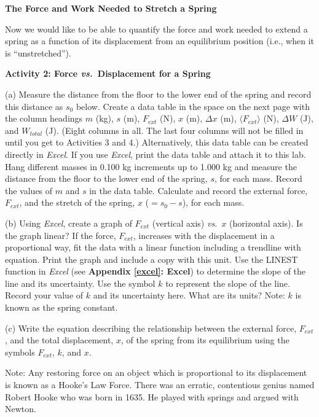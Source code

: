 \textbf{The Force and Work Needed to Stretch a Spring} 

Now we would like to be able to quantify the force and work needed to extend
a spring as a function of its displacement from an equilibrium position (i.e.,
when it is ``unstretched'').

\textbf{Activity 2: Force \textit{vs.}~Displacement for a Spring }

(a) Measure the distance from the floor to the lower end of the spring and record this distance as \( s_{0} \) below. Create a data table in the space on the
next page with the column headings $m$ (kg), $s$ (m), \( F_{ext} \) (N), 
$x$ (m), \( \Delta  x\)
(m), \(\langle F_{ext}\rangle \) (N), \( \Delta  W\) (J), and \( W_{total} \) (J). (Eight columns in all. 
The last four columns will not be filled in until you get to Activities 3 and 4.) 
Alternatively, this data table can be created directly in \textit{Excel}. 
If you use \textit{Excel}, print the data table and attach it to this lab.
Hang different masses in 0.100 kg increments up to 1.000 kg and measure the distance from the floor to the lower end of the spring, $s$, for each mass. 
Record the values of $m$ and $s$ in the data table. 
Calculate and record the external force, \( F_{ext} \), and the stretch of the spring, \(x\) (\(= s_{0} - s\)), for each mass.
\newpage
{\ \ \ }
 \answerspace{60mm}

(b) Using \textit{Excel}, create a graph of \( F_{ext} \) (vertical axis) \textit{vs.}~$x$ (horizontal axis). Is the graph linear?
If the force, \( F_{ext} \), increases with the displacement in a proportional
way, fit the data with a linear function including a trendline with equation. 
Print the graph and include a copy with this unit. Use the LINEST function 
in \textit{Excel} (see \textbf{Appendix \ref{excel}: Excel}) to determine the slope of the 
line and its uncertainty. Use the symbol $k$ to represent the slope of the line.
Record your value of $k$ and its uncertainty here. What are its units? 
Note:  $k$ is known as the spring constant.
\answerspace{15mm}

(c) Write the equation describing the relationship between the external force,
\( F_{ext} \), and the total displacement, 
$x$, of the spring from its equilibrium
using the symbols \( F_{ext} \), $k$, and $x$.
\answerspace{15mm}

Note: Any restoring force on an object which is proportional to its displacement
is known as a Hooke's Law Force. There was an erratic, contentious genius named
Robert Hooke who was born in 1635. He played with springs and argued with 
Newton.


